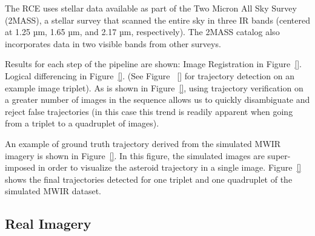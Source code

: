  The RCE uses stellar data available as part of the Two Micron All Sky Survey (2MASS), a stellar survey that scanned the entire sky in three IR bands (centered at 1.25 µm, 1.65 µm, and 2.17 µm, respectively).  The 2MASS catalog also incorporates data in two visible bands from other surveys. 
 
Results for each step of the pipeline are shown:
 Image Registration in Figure~\ref{}. Logical differencing in Figure~\ref{}. (See Figure ~\ref{} for trajectory detection on an example image triplet).    As is shown in Figure~\ref{}, using trajectory verification on a greater number of images in the sequence allows us to quickly disambiguate and reject false trajectories (in this case this trend is readily apparent when going from a triplet to a quadruplet of images).

An example of ground truth trajectory derived from the simulated MWIR imagery is shown in Figure~\ref{}. In this figure, the simulated images are super-imposed in order to visualize the asteroid trajectory in a single image. Figure~\ref{} shows the final trajectories detected for one triplet and one quadruplet of the simulated MWIR dataset.
 
\subsection{Real Imagery}
\label{ssec:real}

